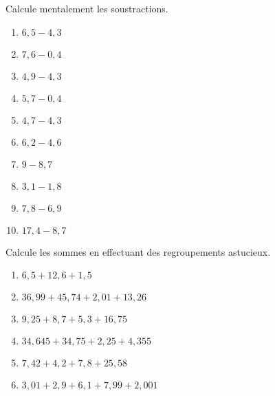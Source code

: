 \begin{exercice}
Calcule mentalement les soustractions.
\begin{enumerate} 
 \item $6,5 - 4,3$ \dotfill \hspace*{12em}
 
 \item $7,6 - 0,4$ \dotfill \hspace*{12em}
 
 \item $4,9 - 4,3$ \dotfill \hspace*{12em}
 
 \item $5,7 - 0,4$ \dotfill \hspace*{12em}
 
 \item $4,7 - 4,3$ \dotfill \hspace*{12em}
 
 \item $6,2 - 4,6$ \dotfill \hspace*{12em}
 
 \item $9 - 8,7$ \dotfill \hspace*{12em}
 
 \item $3,1 - 1,8$ \dotfill \hspace*{12em}
 
 \item $7,8 - 6,9$ \dotfill \hspace*{12em}
 
 \item \hspace{0.2em}$17,4 - 8,7$ \dotfill \hspace*{12em}
 
 \end{enumerate} %
\end{exercice}


\begin{exercice}
Calcule les sommes en effectuant des regroupements astucieux.
\begin{enumerate} 
 \item $6,5 + 12,6 + 1,5$
 \item $36,99 + 45,74 + 2,01 + 13,26$
 \item $9,25 + 8,7 + 5,3 + 16,75$
 \item $34,645 + 34,75 + 2,25 + 4,355$
 \item $7,42 + 4,2 + 7,8 + 25,58$
 \item $3,01 + 2,9 + 6,1 + 7,99 + 2,001$
 \end{enumerate}
\end{exercice}


